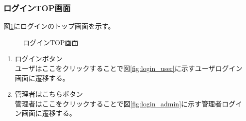 \documentclass[a4j]{jarticle}
\begin{document}
\subsubsection{ログインTOP画面}
図\ref{fig:login_top}にログインのトップ画面を示す。
\begin{figure}[H]
\centering
{}
\caption{ログインTOP画面}
\label{fig:login_top}
\end{figure}
\begin{enumerate}
  \renewcommand{\labelenumi}{\textcircled{\scriptsize \theenumi}}

\item ログインボタン\\
ユーザはここをクリックすることで図\ref{fig:login_user}に示すユーザログイン画面に遷移する。
\item 管理者はこちらボタン\\
管理者はここをクリックすることで図\ref{fig:login_admin}に示す管理者ログイン画面に遷移する。
\end{enumerate}
\end{document}

